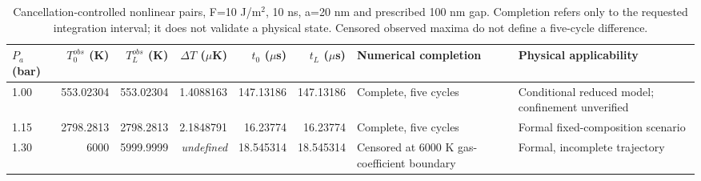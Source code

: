 \begin{table}[H]\centering\footnotesize\setlength{\tabcolsep}{3pt}
\begin{tabular}{lrrrrr>{\raggedright\arraybackslash}p{1.55cm}>{\raggedright\arraybackslash}p{3.1cm}}
\toprule
$P_a$ (bar) & $T_0^{obs}$ (K) & $T_L^{obs}$ (K) & $\Delta T$ ($\mu$K) & $t_0$ ($\mu$s) & $t_L$ ($\mu$s) & Numerical completion & Physical applicability \\ \midrule
1.00 & 553.02304 & 553.02304 & 1.4088163 & 147.13186 & 147.13186 & Complete, five cycles & Conditional reduced model; confinement unverified \\
1.15 & 2798.2813 & 2798.2813 & 2.1848791 & 16.23774 & 16.23774 & Complete, five cycles & Formal fixed-composition scenario \\
1.30 & 6000 & 5999.9999 & \textit{undefined} & 18.545314 & 18.545314 & Censored at 6000 K gas-coefficient boundary & Formal, incomplete trajectory \\
\bottomrule\end{tabular}
\caption{Cancellation-controlled nonlinear pairs, F=10 J/m$^2$, 10 ns, a=20 nm and prescribed 100 nm gap. Completion refers only to the requested integration interval; it does not validate a physical state. Censored observed maxima do not define a five-cycle difference.}
\end{table}
